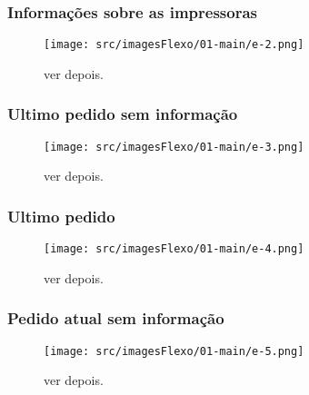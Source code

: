\newpage
\thispagestyle{fancy}

\vspace*{\fill}

\subsubsection{\small{Informações sobre as impressoras}}


\begin{figure}[h]
  \centering
  \texttt{[image: src/imagesFlexo/01-main/e-2.png]}
  \caption{ver depois.}
   \label{}
\end{figure}

\vspace*{\fill}

\newpage
\thispagestyle{fancy}

\vspace*{\fill}

\subsubsection{\small{Ultimo pedido sem informação}}


\begin{figure}[h]
  \centering
  \texttt{[image: src/imagesFlexo/01-main/e-3.png]}
  \caption{ver depois.}
   \label{}
\end{figure}

\vspace*{\fill}



\newpage
\thispagestyle{fancy}

\vspace*{\fill}

\subsubsection{\small{Ultimo pedido}}


\begin{figure}[h]
  \centering
  \texttt{[image: src/imagesFlexo/01-main/e-4.png]}
  \caption{ver depois.}
   \label{}
\end{figure}

\vspace*{\fill}
\newpage
\thispagestyle{fancy}

\vspace*{\fill}

\subsubsection{\small{Pedido atual sem informação}}

\begin{figure}[h]
  \centering
  \texttt{[image: src/imagesFlexo/01-main/e-5.png]}
  \caption{ver depois.}
   \label{}
\end{figure}

\vspace*{\fill}